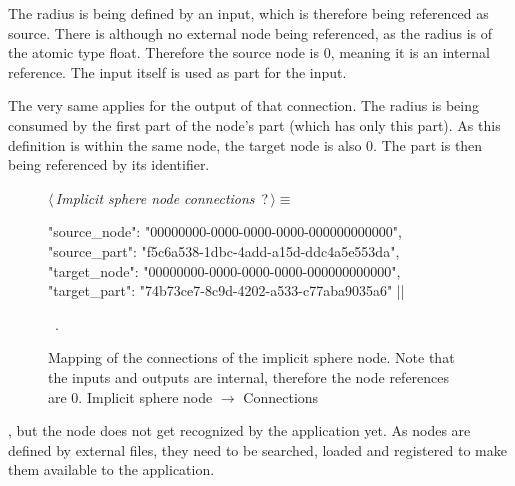 \documentclass[%
    a4paper,    %
    justified,  %
    nobib,      %
    openany     %
]{tufte-book}
\begin{document}
The radius is being defined by an input, which is therefore being referenced as
source. There is although no external node being referenced, as the radius is
of the atomic type float. Therefore the source node is 0, meaning it is an
internal reference. The input itself is used as part for the input.

The very same applies for the output of that connection. The radius is being
consumed by the first part of the node's part (which has only this part). As
this definition is within the same node, the target node is also 0. The part is
then being referenced by its identifier.

\begin{figure}
\begin{flushleft} \small
\begin{minipage}{\linewidth}\label{scrap105}\raggedright\small
{} $\langle\,${\itshape Implicit sphere node connections}\nobreak\ {\footnotesize {?}}$\,\rangle\equiv$
\vspace{-1ex}
\begin{pythoncode}
{
    "source_node": "00000000-0000-0000-0000-000000000000",
    "source_part": "f5c6a538-1dbc-4add-a15d-ddc4a5e553da",
    "target_node": "00000000-0000-0000-0000-000000000000",
    "target_part": "74b73ce7-8c9d-4202-a533-c77aba9035a6"
}|\NWsep|
\end{pythoncode}
\vspace{1.5ex}
\footnotesize
\begin{list}{}{\setlength{\itemsep}{-\parsep}\setlength{\itemindent}{-\leftmargin}}
\item \NWtxtMacroRefIn\ .

\item{}
\end{list}
\end{minipage}\vspace{4ex}
\end{flushleft}
\caption{Mapping of the connections of the implicit sphere node. Note that the
  inputs and outputs are internal, therefore the node references are 0.
  \newline{}\newline{}Implicit sphere node $\rightarrow$ Connections}
\label{editor:lst:nodes:sphere-node:connections}
\end{figure}

, but the node does not get
recognized by the application yet. As nodes are defined by external files, they
need to be searched, loaded and registered to make them available to the
application.
\end{document}
